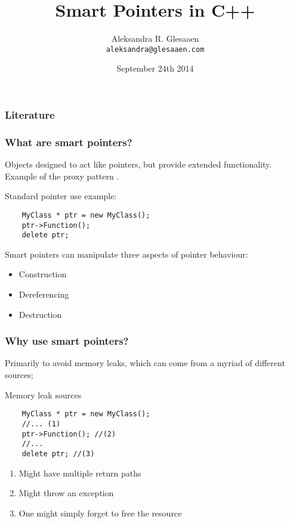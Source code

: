 \documentclass[11pt,a4paper,dvipsnames,usenames]{beamer}
\title[Smart Pointers]{Smart Pointers in C++}
\author{Aleksandra R. Glesaaen \\ \texttt{aleksandra@glesaaen.com}}
\date{September 24th 2014}
\begin{document}
\nocite{*}

\begin{frame}
  \titlepage
\end{frame}

\begin{frame}
  \frametitle{Literature}
  
  {\footnotesize
    }
\end{frame}

\begin{frame}[fragile]
  \frametitle{What are smart pointers?}

  Objects designed to act like pointers, but provide extended functionality. 
  Example of the proxy pattern \cite{patterns}. 

  \vfill

  \begin{exampleblock}{Standard pointer use example:}
    \begin{lstlisting}
    MyClass * ptr = new MyClass();
    ptr->Function();
    delete ptr;
    \end{lstlisting}
  \end{exampleblock}

  \vfill

  Smart pointers can manipulate three aspects of pointer behaviour:

  \begin{itemize}
    \item Construction
    \item Dereferencing
    \item Destruction
  \end{itemize}

\end{frame}

\begin{frame}[fragile]
  \frametitle{Why use smart pointers?}

  \vfill

  Primarily to avoid memory leaks, which can come from a myriad of different sources;

  \vfill

  \begin{exampleblock}{Memory leak sources}
    \begin{lstlisting}
    MyClass * ptr = new MyClass();
    //... (1)
    ptr->Function(); //(2)
    //...
    delete ptr; //(3)
    \end{lstlisting}
  \end{exampleblock}

  \vfill

  \begin{enumerate}
    \item Might have multiple return paths
    \item Might throw an exception
    \item One might simply forget to free the resource
  \end{enumerate}
  
  \vfill


\end{frame}
\end{document}
